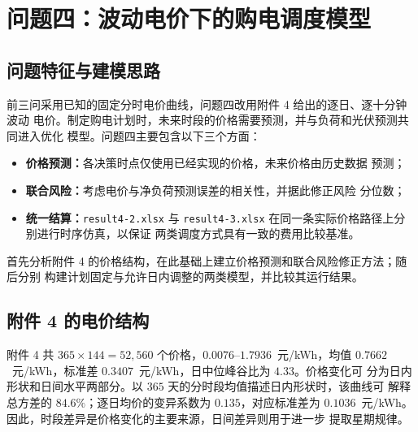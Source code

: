 
\section{问题四：波动电价下的购电调度模型}

\subsection{问题特征与建模思路}

前三问采用已知的固定分时电价曲线，问题四改用附件 4 给出的逐日、逐十分钟波动
电价。制定购电计划时，未来时段的价格需要预测，并与负荷和光伏预测共同进入优化
模型。问题四主要包含以下三个方面：

\begin{itemize}
  \item \textbf{价格预测：}各决策时点仅使用已经实现的价格，未来价格由历史数据
        预测；
  \item \textbf{联合风险：}考虑电价与净负荷预测误差的相关性，并据此修正风险
        分位数；
  \item \textbf{统一结算：}\texttt{result4-2.xlsx} 与
        \texttt{result4-3.xlsx} 在同一条实际价格路径上分别进行时序仿真，以保证
        两类调度方式具有一致的费用比较基准。
\end{itemize}

首先分析附件 4 的价格结构，在此基础上建立价格预测和联合风险修正方法；随后分别
构建计划固定与允许日内调整的两类模型，并比较其运行结果。

\subsection{附件 4 的电价结构}
\label{sec:p4-struct}

附件 4 共 $365\times144=52{,}560$ 个价格，$0.0076$--$1.7936$~元/kWh，均值
$0.7662$~元/kWh，标准差 $0.3407$~元/kWh，日中位峰谷比为 $4.33$。价格变化可
分为日内形状和日间水平两部分。以 $365$ 天的分时段均值描述日内形状时，该曲线可
解释总方差的 $84.6\%$；逐日均价的变异系数为 $0.135$，对应标准差为
$0.1036$~元/kWh。因此，时段差异是价格变化的主要来源，日间差异则用于进一步
提取星期规律。

